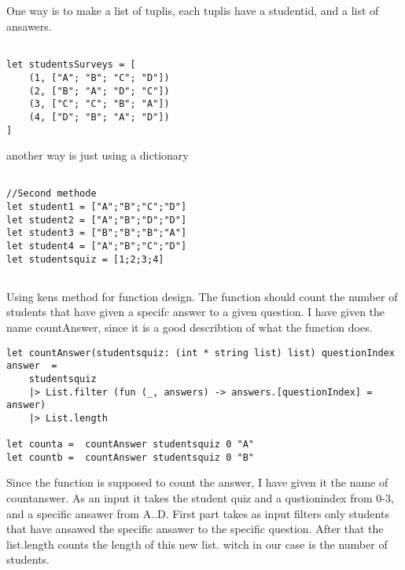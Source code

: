 \documentclass{article}
\begin{document}
\subsection{}
One way is to make a list of tuplis, each tuplis have a studentid, and a list of ansawers.

    \begin{lstlisting}

let studentsSurveys = [
    (1, ["A"; "B"; "C"; "D"])
    (2, ["B"; "A"; "D"; "C"])
    (3, ["C"; "C"; "B"; "A"])
    (4, ["D"; "B"; "A"; "D"])
]

    \end{lstlisting}


another way is just using a dictionary


    \begin{lstlisting}

//Second methode
let student1 = ["A";"B";"C";"D"]
let student2 = ["A";"B";"D";"D"]
let student3 = ["B";"B";"B";"A"]
let student4 = ["A";"B";"C";"D"]
let studentsquiz = [1;2;3;4]

    \end{lstlisting}





\subsection{}

Using kens method for function design. The function should count the number of students that have given a specifc answer to a given question. I have given the name countAnswer, since it is a good describtion of what the function does.


 \begin{lstlisting}
let countAnswer(studentsquiz: (int * string list) list) questionIndex answer  = 
    studentsquiz
    |> List.filter (fun (_, answers) -> answers.[questionIndex] = answer)
    |> List.length 

let counta =  countAnswer studentsquiz 0 "A"
let countb =  countAnswer studentsquiz 0 "B"

    \end{lstlisting}

Since the function is supposed to count the answer, I have given it the name of countanswer. As an input it takes the student quiz and a qustionindex from 0-3, and a specific ansawer from A..D. First part takes as input  filters only students that have ansawed the specific ansawer to the specific question. After that the list.length counts the length of this new list. witch in our case is the number of students.
\end{document}
